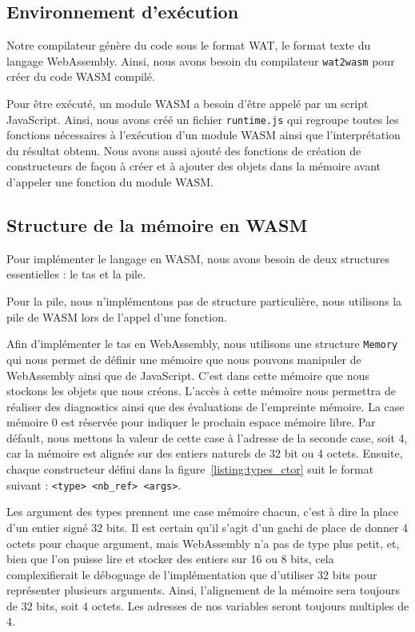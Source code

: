 \documentclass{rapportECL}
\begin{document}
\subsection{Environnement d'exécution}

Notre compilateur génère du code sous le format WAT, le format texte du langage WebAssembly. Ainsi, nous avons besoin
du compilateur \verb|wat2wasm| pour créer du code WASM compilé.

Pour être exécuté, un module WASM a besoin d'être appelé par un script JavaScript. Ainsi, nous avons créé un fichier 
\verb|runtime.js| qui regroupe toutes les fonctions nécessaires à l'exécution d'un module WASM ainsi que l'interprétation
du résultat obtenu. Nous avons aussi ajouté des fonctions de création de constructeurs de façon à créer et à ajouter des objets 
dans la mémoire avant d'appeler une fonction du module WASM.

\subsection{Structure de la mémoire en WASM}

Pour implémenter le langage en WASM, nous avons besoin de deux structures essentielles : le tas et la pile.

\medskip

Pour la pile, nous n'implémentons pas de structure particulière, nous utilisons la pile de WASM lors de l'appel d'une fonction.

\medskip

Afin d'implémenter le tas en WebAssembly, nous utilisons une structure \verb|Memory| qui nous permet de définir une mémoire que 
nous pouvons manipuler de WebAssembly ainsi que de JavaScript.
C'est dans cette mémoire que nous stockons les objets que nous créons.
L'accès à cette mémoire nous permettra de réaliser des diagnostics ainsi que des évaluations de l'empreinte mémoire.
La case mémoire 0 est réservée pour indiquer le prochain espace mémoire libre. Par défault, nous mettons la valeur de cette case à 
l'adresse de la seconde case, soit 4, car la mémoire est alignée sur des entiers naturels de 32 bit ou 4 octets.
Ensuite, chaque constructeur défini dans la figure~\ref{listing:types_ctor} suit le format suivant : \verb|<type> <nb_ref> <args>|. 

Les argument des types prennent une case mémoire chacun, c'est à dire la place d'un entier signé 32 bits. 
Il est certain qu'il s'agit d'un gachi de place de donner 4 octets pour chaque argument, mais WebAssembly n'a pas de type plus
petit, et, bien que l'on puisse lire et stocker des entiers sur 16 ou 8 bits,
cela complexifierait le déboguage de l'implémentation que d'utiliser 32 bits pour représenter plusieurs arguments.
Ainsi, l'alignement de la mémoire sera toujours de 32 bits, soit 4 octets. Les adresses de nos variables seront toujours 
multiples de 4.
\end{document}
